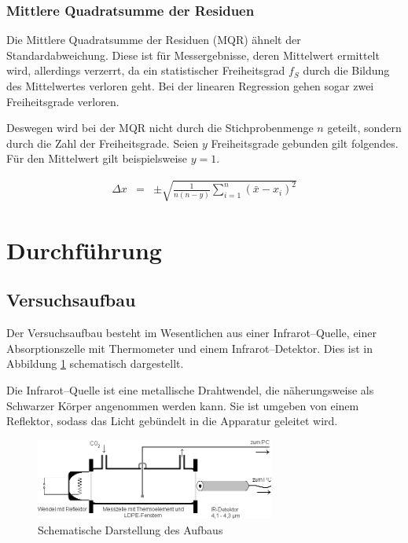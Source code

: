 \documentclass[12pt,a4paper]{scrartcl}
\numberwithin{equation}{section} %
\begin{document}
\hypertarget{mittlere-quadratsumme-der-residuen}{%
\subsubsection{Mittlere Quadratsumme der Residuen}\label{mittlere-quadratsumme-der-residuen}}

Die Mittlere Quadratsumme der Residuen (MQR) ähnelt der Standardabweichung. Diese ist für Messergebnisse, deren Mittelwert ermittelt wird, allerdings verzerrt, da ein statistischer Freiheitsgrad $f_S$ durch die Bildung des Mittelwertes verloren geht. Bei der linearen Regression gehen sogar zwei Freiheitsgrade verloren.

Deswegen wird bei der MQR nicht durch die Stichprobenmenge $n$ geteilt, sondern durch die Zahl der Freiheitsgrade. Seien $y$ Freiheitsgrade gebunden gilt folgendes. Für den Mittelwert gilt beispielsweise $y=1$.

\begin{eqnarray}
    \Delta x &=& \pm\sqrt{\frac{1}{n(n - y)}\sum_{i=1}^n(\bar{x}-x_i)^2}
\end{eqnarray}

\clearpage
\hypertarget{durchfuxfchrung}{%
\section{Durchführung}\label{durchfuxfchrung}}
\subsection{Versuchsaufbau}
\label{Versuchsaufbau}

Der Versuchsaufbau besteht im Wesentlichen aus einer Infrarot--Quelle, einer Absorptionszelle mit Thermometer und einem Infrarot--Detektor. Dies ist in Abbildung \ref{abb:Aufbau} schematisch dargestellt.

Die Infrarot--Quelle ist eine metallische Drahtwendel, die näherungsweise als Schwarzer Körper angenommen werden kann. Sie ist umgeben von einem Reflektor, sodass das Licht gebündelt in die Apparatur geleitet wird.

\begin{figure}[h!]
	\centering
	\includegraphics[width=0.7\textwidth]{../media/B1.1/IR_Aufbau.png}
	\caption{Schematische Darstellung des Aufbaus \cite{UzK}}
	\label{abb:Aufbau}
\end{figure}
\end{document}

